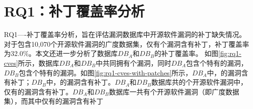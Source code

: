 \section{RQ1：补丁覆盖率分析}\label{sec:coverage}
RQ1----补丁覆盖率分析，旨在评估漏洞数据库中开源软件漏洞的补丁缺失情况。对于包含10,070个开源软件漏洞的广度数据集，仅有个漏洞含有补丁，补丁覆盖率为32.0\%。本文还进一步分析了数据库$DB_A$和$DB_B$的补丁覆盖率。
如图\ref{fig:rq1-cves}所示，数据库$DB_A$和$DB_B$中共同拥有个漏洞，同时$DB_A$包含个特有的漏洞，$DB_B$包含个特有的漏洞。如图\ref{fig:rq1-cves-with-patches}所示，$DB_A$中，的漏洞含有补丁；$DB_B$中，的漏洞含有补丁。$DB_A$和$DB_B$数据库共的个开源软件漏洞中，仅有的漏洞含有补丁。$DB_A$和$DB_B$数据库一共有个开源软件漏洞（即广度数据集），而其中仅有的漏洞含有补丁
